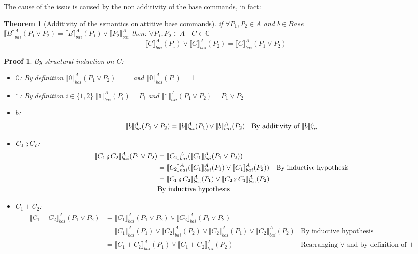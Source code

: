 \documentclass{article}
\newtheorem{theorem}{Theorem}
\newtheorem{proofs}{Proof}
\newcommand*{\sem}[1]{
    \llbracket #1 \rrbracket
}
\newcommand{\bca}[2]{
    #2_{bai}^{#1}
}
\newcommand{\bsem}[2][A]{
    \bca{#1}{\sem{#2}}
}
\def\fcmp{\mathbin{\raise 0.6ex\hbox{\oalign{\hfil$\scriptscriptstyle      
    \mathrm{o}$\hfil\cr\hfil$\scriptscriptstyle\mathrm{9}$\hfil}}}}
\def\lang{\mathbb{C}}
\begin{document}
    The cause of the issue is caused by the non additivity of the base commands,
    in fact:
    \label{thm:add}
    \begin{theorem}[Additivity of the semantics on attitive base commands]
        if $\forall P_1, P_2 \in A$ and $b \in Base$ $\bsem{B}(P_1 \lor P_2)
        = \bsem{B}(P_1) \lor \bsem{P_2}$ then:
        $\forall P_1, P_2 \in A \quad C \in \lang$
        $$\bsem{C}(P_1) \lor \bsem{C}(P_2) = \bsem{C}(P_1 \lor P_2)$$
    \end{theorem}
    \begin{proofs}
        By structural induction on $C$:
        \begin{itemize}
            \item $\mathbb{0}$:
                By definition $\bsem{\mathbb{0}}(P_1 \lor P_2) = \bot$
                and $\bsem{\mathbb{0}}(P_i) = \bot$

            \item $\mathbb{1}$:
                By definition $i \in \{1, 2\} \; \bsem{\mathbb{1}}(P_i) = P_i$
                and $\bsem{\mathbb{1}}(P_1 \lor P_2) = P_1 \lor P_2$

            \item $b$:
                \begin{align*}
                    \bsem{b}(P_1 \lor P_2)
                        &= \bsem{b}(P_1) \lor \bsem{b}(P_2)
                        &\text{By additivity of $\bsem{b}$} \\
                \end{align*}

            \item $C_1 \fcmp C_2$:
                \begin{align*}
                    \bsem{C_1 \fcmp C_2}(P_1 \lor P_2)
                        &= \bsem{C_2}(\bsem{C_1}(P_1 \lor P_2)) \\
                        &= \bsem{C_2}(\bsem{C_1}(P_1) \lor \bsem{C_1}(P_2))
                        &\text{By inductive hypothesis} \\
                        &= \bsem{C_1 \fcmp C_2}(P_1) 
                            \lor \bsem{C_2 \fcmp C_2}(P_2) \\
                        &\text{By inductive hypothesis} \\
                \end{align*}

            \item $C_1 + C_2$:
                \begin{align*}
                    \bsem{C_1 + C_2}(P_1 \lor P_2)
                        &= \bsem{C_1}(P_1 \lor P_2) \lor \bsem{C_2}(P_1 \lor P_2) \\
                        &=\bsem{C_1}(P_1) \lor \bsem{C_2}(P_2) 
                            \lor \bsem{C_2}(P_1) \lor \bsem{C_2}(P_2)
                        &\text{By inductive hypothesis} \\
                        &= \bsem{C_1 + C_2}(P_1) \lor \bsem{C_1 + C_2}(P_2)
                        &\text{Rearranging $\lor$ and by definition of +} \\
                \end{align*}


\end{itemize}
\end{proofs}
\end{document}
